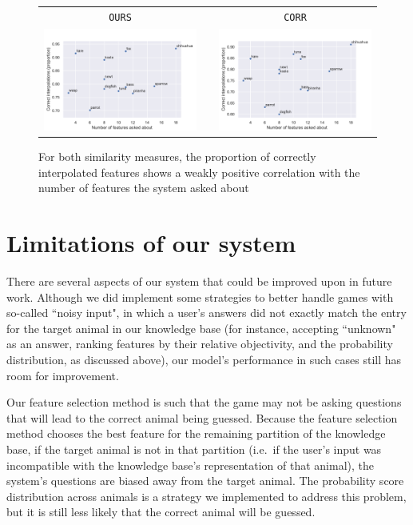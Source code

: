 \documentclass[11pt,a4paper]{article}
\begin{document}
{\begin{figure}
\centering
\begin{tabular}{@{}ccc}
\texttt{OURS} && \texttt{CORR} \\
\includegraphics[trim=0 0 0 30,clip,width=.48\linewidth]{graphics/interpolation-eval-ours.pdf} && 
\includegraphics[trim=0 0 0 30,clip,width=.48\linewidth]{graphics/interpolation-eval-corr.pdf} \\
\end{tabular}
	\caption{For both similarity measures, the proportion of correctly interpolated features shows a weakly positive correlation with the number of features the system asked about}
	\label{fig:interp-eval}
\end{figure}

\section{Limitations of our system}
\label{sec:limit}

There are several aspects of our system that could be improved upon in future work. 
Although we did implement some strategies to better handle games with so-called ``noisy input", in which a user's answers did not exactly match the entry for the target animal in our knowledge base (for instance, accepting ``unknown" as an answer, ranking features by their relative objectivity, and the probability distribution, as discussed above), our model's performance in such cases still has room for improvement. 

Our feature selection method is such that the game may not be asking questions that will lead to the correct animal being guessed. 
Because the feature selection method chooses the best feature for the remaining partition of the knowledge base, if the target animal is not in that partition (i.e.\ if the user's input was incompatible with the knowledge base's representation of that animal), the system's questions are biased away from the target animal. 
The probability score distribution across animals is a strategy we implemented to address this problem, but it is still less likely that the correct animal will be guessed.

}
\end{document}
